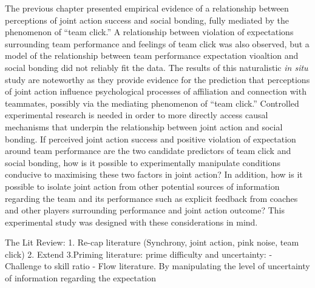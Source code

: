 \documentclass[english]{article}\usepackage[]{graphicx}\usepackage[]{color}
\begin{document}
The previous chapter presented empirical evidence of a relationship between perceptions of joint action success and social bonding, fully mediated by the phenomenon of ``team click.'' A relationship between violation of expectations surrounding team performance and feelings of team click was also observed, but a model of the relationship between team performance expectation vioaltion and social bonding did not reliably fit the data.  The results of this naturalistic \textit{in situ} study are noteworthy as they provide evidence for the prediction that perceptions of joint action influence psychological processes of affiliation and connection with teammates, possibly via the mediating phenomenon of ``team click.''  Controlled experimental research is needed in order to more directly access causal mechanisms that underpin the relationship between joint action and social bonding.  If perceived joint action success and positive violation of expectation around team performance are the two candidate predictors of team click and social bonding, how is it possible to experimentally manipulate conditions conducive to maximising these two factors in joint action? In addition, how is it possible to isolate joint action from other potential sources of information regarding the team and its performance such as explicit feedback from coaches and other players surrounding performance and joint action outcome? This experimental study was designed with these considerations in mind.

The Lit Review:
1. Re-cap literature (Synchrony, joint action, pink noise, team click)
2. Extend
3.Priming literature: prime difficulty and uncertainty:
- Challenge to skill ratio - Flow literature.
By manipulating the level of uncertainty of information regarding the expectation



\end{document}
